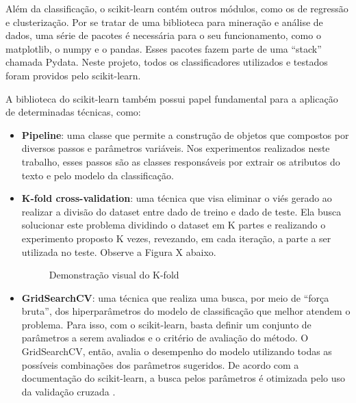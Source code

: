 Além da classificação, o scikit-learn contém outros módulos, como os de regressão e clusterização. Por se tratar de uma biblioteca para mineração e análise de dados, uma série de pacotes é necessária para o seu funcionamento, como o matplotlib, o numpy e o pandas. Esses pacotes fazem parte de uma “stack” chamada Pydata. Neste projeto, todos os classificadores utilizados e testados foram providos pelo scikit-learn.

A biblioteca do scikit-learn também possui papel fundamental para a aplicação de determinadas técnicas, como:

\begin{itemize}
    \item \textbf{Pipeline}: uma classe que permite a construção de objetos que compostos por diversos passos e parâmetros variáveis. Nos experimentos realizados neste trabalho, esses passos são as classes responsáveis por extrair os atributos do texto e pelo modelo da classificação.
    \item \textbf{K-fold cross-validation}: uma técnica que visa eliminar o viés gerado ao realizar a divisão do dataset entre dado de treino e dado de teste. Ela busca solucionar este problema dividindo o dataset em K partes e realizando o experimento proposto K vezes, revezando, em cada iteração, a parte a ser utilizada no teste. Observe a Figura X abaixo.
    
    \begin{figure}[!htb]
        \caption{\label{fig:my-label} Demonstração visual do K-fold}
    \end{figure}
    
   \item \textbf{GridSearchCV}: uma técnica que realiza uma busca, por meio de “força bruta”, dos hiperparâmetros do modelo de classificação que melhor atendem o problema. Para isso, com o scikit-learn, basta definir um conjunto de parâmetros a serem avaliados e o critério de avaliação do método. O GridSearchCV, então, avalia o desempenho do modelo utilizando todas as possíveis combinações dos parâmetros sugeridos. De acordo com a documentação do scikit-learn, a busca pelos parâmetros é otimizada pelo uso da validação cruzada \cite{scikit-learn}.
\end{itemize}

